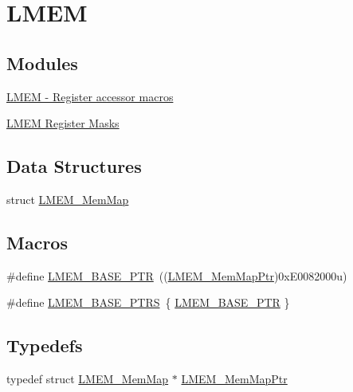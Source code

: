 \hypertarget{group___l_m_e_m___peripheral}{}\section{L\+M\+E\+M}
\label{group___l_m_e_m___peripheral}
\subsection*{Modules}
\begin{DoxyCompactItemize}
\item 
\hyperlink{group___l_m_e_m___register___accessor___macros}{L\+M\+E\+M -\/ Register accessor macros}
\item 
\hyperlink{group___l_m_e_m___register___masks}{L\+M\+E\+M Register Masks}
\end{DoxyCompactItemize}
\subsection*{Data Structures}
\begin{DoxyCompactItemize}
\item 
struct \hyperlink{struct_l_m_e_m___mem_map}{L\+M\+E\+M\+\_\+\+Mem\+Map}
\end{DoxyCompactItemize}
\subsection*{Macros}
\begin{DoxyCompactItemize}
\item 
\#define \hyperlink{group___l_m_e_m___peripheral_ga1666dc97b6d56a81369b43b1ee4ae240}{L\+M\+E\+M\+\_\+\+B\+A\+S\+E\+\_\+\+P\+T\+R}~((\hyperlink{group___l_m_e_m___peripheral_gad8e02e2903502eea2a0cc497a0dde6d8}{L\+M\+E\+M\+\_\+\+Mem\+Map\+Ptr})0x\+E0082000u)
\item 
\#define \hyperlink{group___l_m_e_m___peripheral_ga3b8cec218a8a57a762a94905faf149b4}{L\+M\+E\+M\+\_\+\+B\+A\+S\+E\+\_\+\+P\+T\+R\+S}~\{ \hyperlink{group___l_m_e_m___peripheral_ga1666dc97b6d56a81369b43b1ee4ae240}{L\+M\+E\+M\+\_\+\+B\+A\+S\+E\+\_\+\+P\+T\+R} \}
\end{DoxyCompactItemize}
\subsection*{Typedefs}
\begin{DoxyCompactItemize}
\item 
typedef struct \hyperlink{struct_l_m_e_m___mem_map}{L\+M\+E\+M\+\_\+\+Mem\+Map} $\ast$ \hyperlink{group___l_m_e_m___peripheral_gad8e02e2903502eea2a0cc497a0dde6d8}{L\+M\+E\+M\+\_\+\+Mem\+Map\+Ptr}
\end{DoxyCompactItemize}


